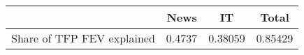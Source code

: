 \begin{small}
	\begin{tabular}{lccc}
	\hline
		& News & IT & Total \\
		\hline
		Share of TFP FEV explained & 0.4737 & 0.38059 & 0.85429 \\
		\hline
	\end{tabular}
\end{small}
